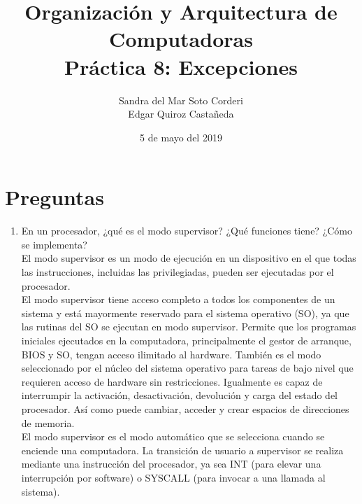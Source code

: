 \documentclass{article}
\begin{document}
    \title{
        Organización y Arquitectura de Computadoras \\
        Práctica 8: Excepciones \\
    }
    \date{
        5 de mayo del 2019
    }
    \author{
        Sandra del Mar Soto Corderi \\
        Edgar Quiroz Castañeda
    }
    \maketitle

    \section{Preguntas}
    \begin{enumerate}
    
    \item {
    En un procesador, ¿qué es el modo supervisor? ¿Qué funciones tiene?
    ¿Cómo se implementa?\\
    
    El modo supervisor es un modo de ejecución en un dispositivo en el que todas las instrucciones, incluidas las privilegiadas, pueden ser ejecutadas por el procesador.\cite{supervisor}\\
    
    El modo supervisor tiene acceso completo a todos los componentes de un sistema y está mayormente reservado para el sistema operativo (SO), ya que las rutinas del SO se ejecutan en modo supervisor.  Permite que los programas iniciales ejecutados en la computadora, principalmente el gestor de arranque, BIOS y SO, tengan acceso ilimitado al hardware. También es el modo seleccionado por el núcleo del sistema operativo para tareas de bajo nivel que requieren acceso de hardware sin restricciones. Igualmente es capaz de interrumpir la activación, desactivación, devolución y carga del estado del procesador. Así como puede cambiar, acceder y crear espacios de direcciones de memoria.\cite{supervisor}\\

	El modo supervisor es el modo automático que se selecciona cuando se enciende una computadora. La transición de usuario a supervisor se realiza mediante una instrucción del procesador, ya sea INT (para elevar una interrupción por software) o SYSCALL (para invocar a una llamada al sistema).\cite{sevilla}\\

	}


\end{enumerate}
\end{document}
